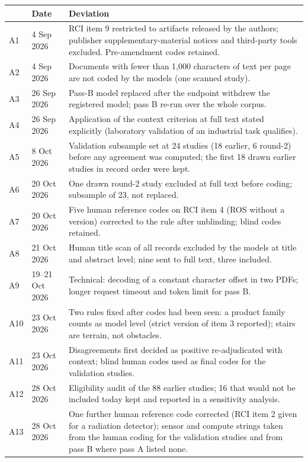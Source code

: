 \documentclass[10pt]{article}
\begin{document}
{\small
\begin{longtable}{p{0.8cm}p{2.0cm}p{12.6cm}}
\toprule
& Date & Deviation\\
\midrule\endhead
\bottomrule\endfoot
A1 & 4 Sep 2026 & RCI item 9 restricted to artifacts released by the authors; publisher supplementary-material notices and third-party tools excluded. Pre-amendment codes retained.\\
A2 & 4 Sep 2026 & Documents with fewer than 1{,}000 characters of text per page are not coded by the models (one scanned study).\\
A3 & 26 Sep 2026 & Pass-B model replaced after the endpoint withdrew the registered model; pass B re-run over the whole corpus.\\
A4 & 26 Sep 2026 & Application of the context criterion at full text stated explicitly (laboratory validation of an industrial task qualifies).\\
A5 & 8 Oct 2026 & Validation subsample set at 24 studies (18 earlier, 6 round-2) before any agreement was computed; the first 18 drawn earlier studies in record order were kept.\\
A6 & 20 Oct 2026 & One drawn round-2 study excluded at full text before coding; subsample of 23, not replaced.\\
A7 & 20 Oct 2026 & Five human reference codes on RCI item 4 (ROS without a version) corrected to the rule after unblinding; blind codes retained.\\
A8 & 21 Oct 2026 & Human title scan of all records excluded by the models at title and abstract level; nine sent to full text, three included.\\
A9 & 19--21 Oct 2026 & Technical: decoding of a constant character offset in two PDFs; longer request timeout and token limit for pass B.\\
A10 & 23 Oct 2026 & Two rules fixed after codes had been seen: a product family counts as model level (strict version of item 3 reported); stairs are terrain, not obstacles.\\
A11 & 23 Oct 2026 & Disagreements first decided as positive re-adjudicated with context; blind human codes used as final codes for the validation studies.\\
A12 & 28 Oct 2026 & Eligibility audit of the 88 earlier studies; 16 that would not be included today kept and reported in a sensitivity analysis.\\
A13 & 28 Oct 2026 & One further human reference code corrected (RCI item 2 given for a radiation detector); sensor and compute strings taken from the human coding for the validation studies and from pass B where pass A listed none.\\
\end{longtable}
}
\end{document}
